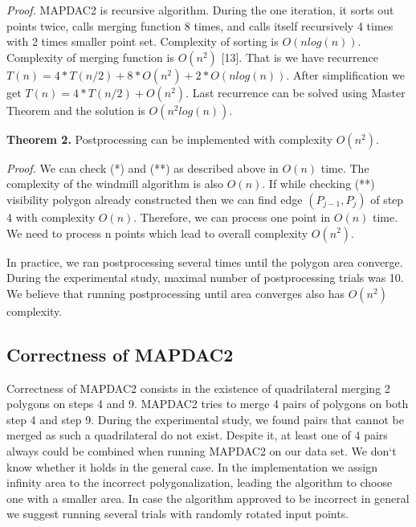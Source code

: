 \documentclass[conference]{IEEEtran}
\begin{document}
			\textit{Proof.}
			MAP{\textunderscore}DAC2 is recursive algorithm.
			During the one iteration, it sorts out points twice, calls merging function 8 times, and calls itself recursively 4 times with 2 times smaller point set.
			Complexity of sorting is $O(n log(n))$.
			Complexity of merging function is $O(n^{2})$ [13].
			That is we have recurrence $T(n) = 4*T(n/2) + 8 * O(n^{2}) + 2 * O(n log(n))$.
			After simplification we get $T(n) = 4*T(n/2) + O(n^{2})$.
			Last recurrence can be solved using Master Theorem and the solution is $O(n^{2}log(n))$.
	
			\textbf{Theorem 2.}
			Postprocessing can be implemented with complexity $O(n^{2})$.
			
			\textit{Proof.}
			We can check (*) and (**) as described above in $O(n)$ time.
			The complexity of the windmill algorithm is also $O(n)$.
			If while checking (**) visibility polygon already constructed then we can find edge $(P_{j-1}, P_{j})$ of step 4 with complexity $O(n)$.
			Therefore, we can process one point in $O(n)$ time.
			We need to process n points which lead to overall complexity $O(n^{2})$.
	
			In practice, we ran postprocessing several times until the polygon area converge.
			During the experimental study, maximal number of postprocessing trials was 10.
			We believe that running postprocessing until area converges also has $O(n^{2})$ complexity.
			
		\subsection {Correctness of MAP{\textunderscore}DAC2}
			Correctness of MAP{\textunderscore}DAC2 consists in the existence of quadrilateral merging 2 polygons on steps 4 and 9.
			MAP{\textunderscore}DAC2 tries to merge 4 pairs of polygons on both step 4 and step 9.
			During the experimental study, we found pairs that cannot be merged as such a quadrilateral do not exist.
			Despite it, at least one of 4 pairs always could be combined when running MAP{\textunderscore}DAC2 on our data set.
			We don`t know whether it holds in the general case.
			In the implementation we assign infinity area to the incorrect polygonalization, leading the algorithm to choose one with a smaller area.
			In case the algorithm approved to be incorrect in general we suggest running several trials with randomly rotated input points.
	
\end{document}
